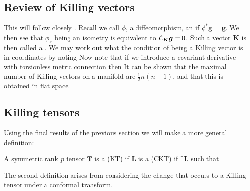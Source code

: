 \documentclass{article}
\begin{document}
\subsection{Review of Killing vectors}

This will follow closely \cite{Hansen2014Killing-YanoTensors}.  Recall we call $\phi$, a diffeomorphism, an  if $\phi^\ast \bm{g} = \bm{g}$. 
We then see that $\phi_s$ being an isometry is equivalent to $\mathcal{L}_{\bm{K}}\bm{g} = 0$. Such a vector $\bm{K}$ is then called a . We may work out what the condition of being a Killing vector is in coordinates by noting 
Now note that if we introduce a covariant derivative with torsionless metric connection then 
It can be shown that the maximal number of Killing vectors on a manifold are $\frac{1}{2}n(n+1)$, and that this is obtained in flat space. 
\subsection{Killing tensors}
Using the final results of the previous section we will make a more general definition:

\begin{definition}
A symmetric rank $p$ tensor $\bm{T}$ is a  (KT) if 
$\bm{L}$ is a  (CKT) if $\exists \bar{\bm{L}}$ such that 
\end{definition}
The second definition arises from considering the change that occurs to a Killing tensor under a conformal transform. 
\end{document}
